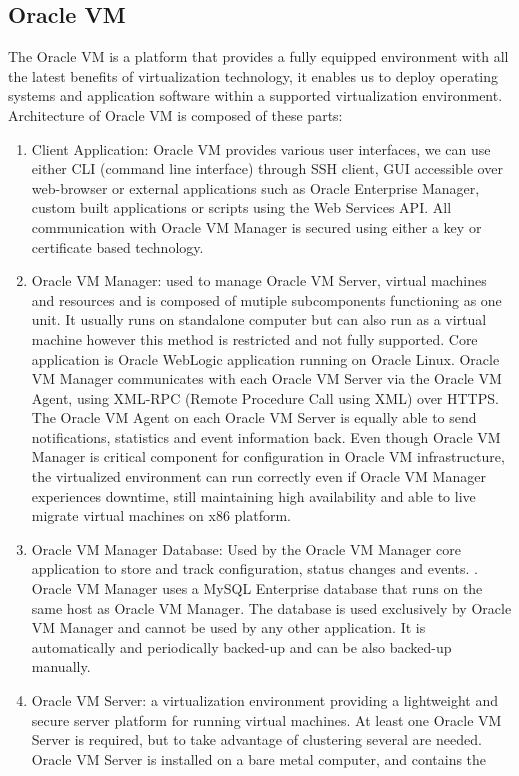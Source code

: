 \subsection{Oracle VM}
The Oracle VM is a platform that provides a fully equipped environment with all the latest benefits of virtualization technology, it enables us to deploy operating systems and application software within a supported virtualization environment.
Architecture of Oracle VM is composed of these parts:
\begin{enumerate}
\item Client Application: Oracle VM provides various user interfaces, we can use either CLI (command line interface) through SSH client, GUI accessible over web-browser or external applications such as Oracle Enterprise Manager, custom built applications or scripts using the Web Services API. All communication with Oracle VM Manager is secured using either a key or certificate based technology.
\item Oracle VM Manager: used to manage Oracle VM Server, virtual machines and resources and is composed of mutiple subcomponents functioning as one unit. It usually runs on standalone computer but can also run as a virtual machine however this method is restricted and not fully supported. Core application is Oracle WebLogic application running on Oracle Linux. Oracle VM Manager communicates with each Oracle VM Server via the Oracle VM Agent, using XML-RPC (Remote Procedure Call using XML) over HTTPS.  The Oracle VM Agent on each Oracle VM Server is equally able to send notifications, statistics and event information back. Even though Oracle VM Manager is critical component for configuration in Oracle VM infrastructure, the virtualized environment can run correctly even if Oracle VM Manager experiences downtime, still maintaining high availability and able to live migrate virtual machines on x86 platform.
\item Oracle VM Manager Database:  Used by the Oracle VM Manager core application to store and track configuration, status changes and events. . Oracle VM Manager uses a MySQL Enterprise database that runs on the same host as Oracle VM Manager. The database is used exclusively by Oracle VM Manager and cannot be used by any other application. It is automatically and periodically backed-up and can be also backed-up manually.
\item Oracle VM Server: a virtualization environment providing a lightweight and secure server platform for running virtual machines. At least one Oracle VM Server is required, but to take advantage of clustering several are needed. Oracle VM Server is installed on a bare metal computer, and contains the 

\end{enumerate}
